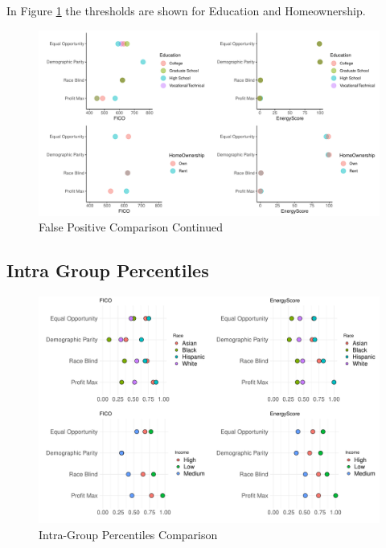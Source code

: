\documentclass[11pt,]{article}
\begin{document}
In Figure \ref{fig:fpfig2} the thresholds are shown for Education and
Homeownership.

\begin{figure}
\centering
\includegraphics{figs/fpfig2.pdf}
\caption{\label{fig:fpfig2}False Positive Comparison Continued}
\end{figure}

\hypertarget{intra-group-percentiles}{%
\subsection{Intra Group Percentiles}\label{intra-group-percentiles}}

\begin{figure}
\centering
\includegraphics{figs/intra.pdf}
\caption{\label{fig:intra}Intra-Group Percentiles Comparison}
\end{figure}
\end{document}
